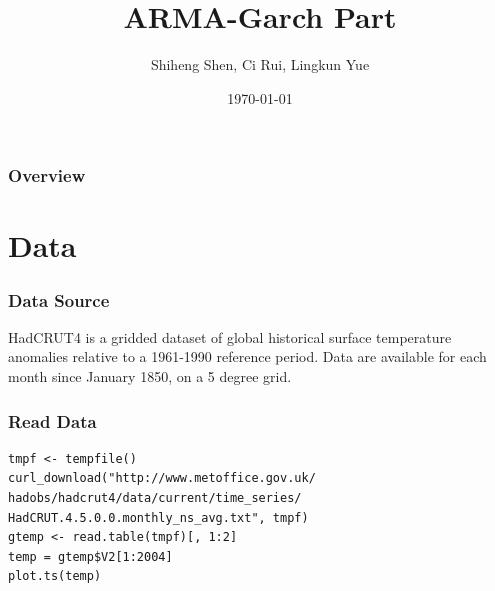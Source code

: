 \documentclass[9pt]{beamer}
\title{ARMA-Garch Part} %
\author{Shiheng Shen, Ci Rui, Lingkun Yue} %
\institute[PKU] %
{
}
\date{\today} %
\begin{document}
\begin{frame}
\titlepage %
\end{frame}

\begin{frame}
\frametitle{Overview} %
\tableofcontents %
\end{frame}


\section{Data} %


\begin{frame}
\frametitle{Data Source}
HadCRUT4 is a gridded dataset of global historical surface temperature anomalies relative to a 1961-1990 reference period. Data are available for each month since January 1850, on a 5 degree grid.
\end{frame}


\begin{frame}[fragile]
\frametitle{Read Data}
\begin{verbatim}
tmpf <- tempfile()
curl_download("http://www.metoffice.gov.uk/
hadobs/hadcrut4/data/current/time_series/
HadCRUT.4.5.0.0.monthly_ns_avg.txt", tmpf)
gtemp <- read.table(tmpf)[, 1:2]
temp = gtemp$V2[1:2004] 
plot.ts(temp)
\end{verbatim}
\end{frame}
\end{document}
